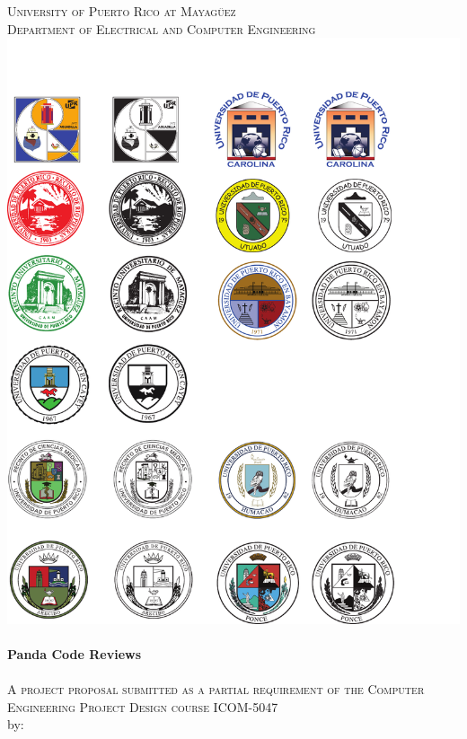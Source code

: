 \begin{titlepage}

\begin{center}


    

\textsc{\large University of Puerto Rico at Mayagüez}\\[0.3cm]
\textsc{\large Department of Electrical and Computer Engineering}\\[1cm]
\includegraphics[scale=1.25]{res/logo_rum}\\[1.2cm]


\HRule \\[0.4cm]
{ \huge \bfseries Panda Code Reviews}\\
\HRule \\[0.3cm]
\textsc{A project proposal submitted as a partial requirement of the Computer Engineering Project Design course ICOM-5047}\\[0.7cm]

by: \\[0.3cm]


\end{center}
\end{titlepage}
